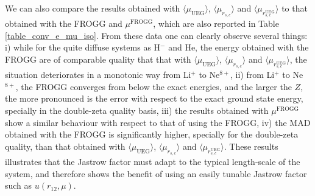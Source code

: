 \documentclass[aip,jcp,reprint,noshowkeys,superscriptaddress,twocolumn]{revtex4-1}
\newcommand{\mfrogg}[0]{\mu^\text{FROGG}}
\newcommand{\muuegav}{\langle \mu_{\text{UEG}}\rangle}
\newcommand{\murscav}{\langle \mu_{r_{s,c}}\rangle}
\newcommand{\mursclda}{\langle \mu_{r_{s,c}^{\text{UEG}}}\rangle}
\begin{document}
We can also compare the results obtained with $\muuegav$, $\murscav$ and $\mursclda$ to that obtained with the FROGG and $\mfrogg$, which are also reported in Table \ref{table_conv_e_mu_iso}. 
From these data one can clearly observe several things: i) while for the quite diffuse systems as H$^-$ and He, the energy obtained with the FROGG are of comparable quality that that with $\muuegav$, $\murscav$ and $\mursclda$, the situation deteriorates in a monotonic way from Li$^+$ to Ne$^{8+}$, ii) from Li$^+$ to Ne$^{8+}$, the FROGG converges from below the exact energies, and the larger the $Z$, the more pronounced is the error with respect to the exact ground state energy, specially in the double-zeta quality basis, iii) the results obtained with $\mfrogg$ show a similar behaviour with respect to that of using the FROGG, iv) the MAD obtained with the FROGG is significantly higher, specially for the double-zeta quality, than that obtained with $\muuegav$, $\murscav$ and $\mursclda$. 
These results illustrates that the Jastrow factor must adapt to the typical length-scale of the system, and therefore shows the benefit of using an easily tunable Jastrow factor such as $u(r_{12},\mu)$. 
\end{document}
